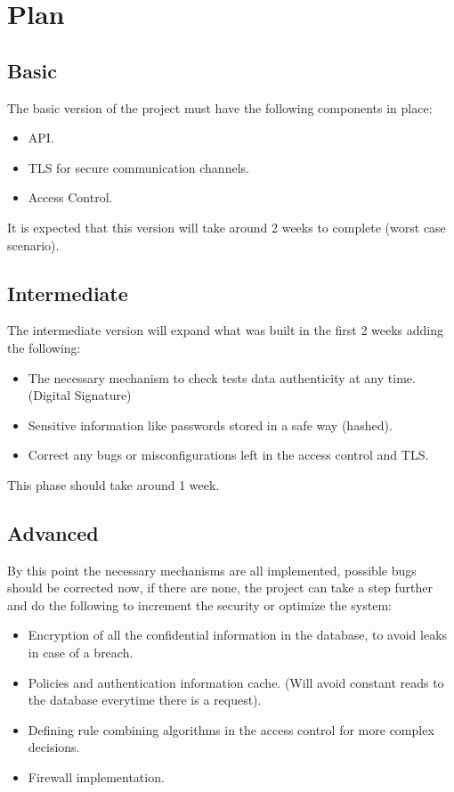 \section{Plan}

\subsection{Basic}
The basic version of the project must have the following components in place:
\begin{itemize}
	\item API.
	\item TLS for secure communication channels.
	\item Access Control.
\end{itemize}

It is expected that this version will take around 2 weeks to complete (worst case scenario). 


\subsection{Intermediate}
The intermediate version will expand what was built in the first 2 weeks adding the following:
\begin{itemize}
	\item The necessary mechanism to check tests data authenticity at any time. (Digital Signature)
	\item Sensitive information like passwords stored in a safe way (hashed).
	\item Correct any bugs or misconfigurations left in the access control and TLS.
\end{itemize}

This phase should take around 1 week.


\subsection{Advanced}

By this point the necessary mechanisms are all implemented, possible bugs should be corrected now, if there are none, the project can take a step further and do the following to increment the security or optimize the system:

\begin{itemize}
	\item Encryption of all the confidential information in the database, to avoid leaks in case of a breach.
	\item Policies and authentication information cache. (Will avoid constant reads to the database everytime there is a request).
	\item Defining rule combining algorithms in the access control for  more complex decisions.
	\item Firewall implementation.
\end{itemize}


